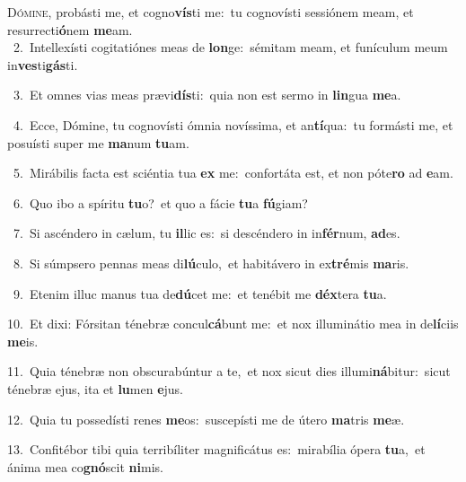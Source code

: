 \lettrine{\initial\textcolor{\initialcolor}{D}}{ómine,} probásti me, et cogno\-\textbf{vís}\-ti me:~\star tu cognovísti sessiónem meam, et resurrecti\-\textbf{ó}\-nem \textbf{me}\-am.\\
{\numbfont\textcolor{\numbcolor}{~2.}}~Intellexísti cogitatiónes meas de \textbf{lon}\-ge:~\star sémitam meam, et funículum meum in\-\textbf{ves}\-ti\-\textbf{gás}\-ti.\par
{\numbfont\textcolor{\numbcolor}{~3.}}~Et omnes vias meas prævi\-\textbf{dís}\-ti:~\star quia non est sermo in \textbf{lin}\-gua \textbf{me}\-a.\par
{\numbfont\textcolor{\numbcolor}{~4.}}~Ecce, Dómine, tu cognovísti ómnia novíssima, et an\-\textbf{tí}\-qua:~\star tu formásti me, et posuísti super me \textbf{ma}\-num \textbf{tu}\-am.\par
{\numbfont\textcolor{\numbcolor}{~5.}}~Mirábilis facta est sciéntia tua \textbf{ex} me:~\star confortáta est, et non póte\textbf{ro} ad \textbf{e}\-am.\par
{\numbfont\textcolor{\numbcolor}{~6.}}~Quo ibo a spíritu \textbf{tu}\-o?~\star et quo a fácie \textbf{tu}\-a \textbf{fú}\-giam?\par
{\numbfont\textcolor{\numbcolor}{~7.}}~Si ascéndero in cælum, tu \textbf{il}\-lic es:~\star si descéndero in in\-\textbf{fér}\-num, \textbf{ad}\-es.\par
{\numbfont\textcolor{\numbcolor}{~8.}}~Si súmpsero pennas meas di\-\textbf{lú}\-culo,~\star et habitávero in ex\-\textbf{tré}\-mis \textbf{ma}\-ris.\par
{\numbfont\textcolor{\numbcolor}{~9.}}~Etenim illuc manus tua de\-\textbf{dú}\-cet me:~\star et tenébit me \textbf{déx}\-tera \textbf{tu}\-a.\par
{\numbfont\textcolor{\numbcolor}{10.}}~Et dixi: Fórsitan ténebræ concul\-\textbf{cá}\-bunt me:~\star et nox illuminátio mea in de\-\textbf{lí}\-ciis \textbf{me}\-is.\par
{\numbfont\textcolor{\numbcolor}{11.}}~Quia ténebræ non obscurabúntur a te,~\dagger et nox sicut dies illumi\-\textbf{ná}\-bitur:~\star sicut ténebræ ejus, ita et \textbf{lu}\-men \textbf{e}\-jus.\par
{\numbfont\textcolor{\numbcolor}{12.}}~Quia tu possedísti renes \textbf{me}\-os:~\star suscepísti me de útero \textbf{ma}\-tris \textbf{me}\-æ.\par
{\numbfont\textcolor{\numbcolor}{13.}}~Confitébor tibi quia terribíliter magnificátus es:~\dagger mirabília ópera \textbf{tu}\-a,~\star et ánima mea co\-\textbf{gnó}\-scit \textbf{ni}\-mis.\par
